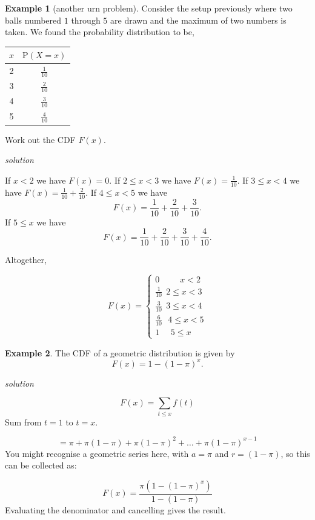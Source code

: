 \documentclass[
]{book}
\theoremstyle{definition}
\theoremstyle{definition}
\newtheorem{example}{Example}[chapter]
\theoremstyle{definition}
\theoremstyle{definition}
\theoremstyle{remark}
\begin{document}
\begin{example}[another urn problem]
Consider the setup previously where two balls numbered \(1\) through \(5\) are drawn and the maximum of two numbers is taken.
We found the probability distribution to be,

\begin{longtable}[]{@{}cc@{}}
\toprule
\(x\) & \(\text{P}(X=x)\)\tabularnewline
\midrule
\endhead
2 & \(\frac{1}{10}\)\tabularnewline
3 & \(\frac{2}{10}\)\tabularnewline
4 & \(\frac{3}{10}\)\tabularnewline
5 & \(\frac{4}{10}\)\tabularnewline
\bottomrule
\end{longtable}

Work out the CDF \(F(x)\).

\emph{solution}

If \(x<2\) we have \(F(x)=0\).
If \(2\leq x < 3\) we have \(F(x) = \frac{1}{10}\).
If \(3\leq x < 4\) we have \(F(x) = \frac{1}{10} + \frac{2}{10}\).
If \(4\leq x < 5\) we have \[F(x) = \frac{1}{10} + \frac{2}{10} + \frac{3}{10}.\]
If \(5\leq x\) we have \[F(x) = \frac{1}{10} + \frac{2}{10} + \frac{3}{10} + \frac{4}{10}.\]

Altogether,

\begin{equation*}
  F(x)=\begin{cases}
  0  \ \ \ \ \ \ \ \ \ \ \   x<2 \\
  \frac{1}{10} \  \  2\leq x < 3 \\
  \frac{3}{10} \ \  3\leq x < 4 \\
  \frac{6}{10} \ \ \ 4\leq x < 5 \\
  1 \ \ \  \ \ \  5\leq x
  \end{cases}
\end{equation*}
\end{example}

\begin{example}
The CDF of a geometric distribution is given by
\[F(x) = 1- (1-\pi)^{x}.\]
\end{example}

\emph{solution}

\[F(x) = \sum_{t\leq x}f(t)\]
Sum from \(t=1\) to \(t=x\).

\[  = \pi + \pi(1-\pi) + \pi(1-\pi)^2 + \dots +  \pi(1-\pi)^{x-1} \]
You might recognise a geometric series here, with \(a=\pi\) and \(r=(1-\pi)\), so this can be collected as:

\[F(x) = \frac{\pi (1-(1-\pi)^x)}{1-(1-\pi)} \]
Evaluating the denominator and cancelling gives the result.
\end{document}
